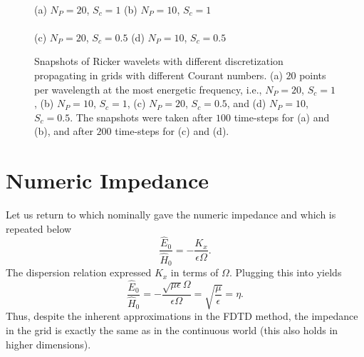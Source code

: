\begin{figure}
  \hspace{.1in}
  \\
  \mbox{}\hspace{1.in}(a) $N_P=20$, $S_c=1$
         \hspace{1.95in}(b) $N_P=10$, $S_c=1$\\

  \vspace{.1in}
  \hspace{.1in}
  \\
  \mbox{}\hspace{.95in}(c) $N_P=20$, $S_c=0.5$
         \hspace{1.95in}(d) $N_P=10$, $S_c=0.5$
  \caption{Snapshots of Ricker wavelets with different discretization
  propagating in grids with different Courant numbers.  (a) $20$
  points per wavelength at the most energetic frequency, i.e.,
  $N_P=20$, $S_c=1$, (b) $N_P=10$, $S_c=1$, (c) $N_P=20$, $S_c=0.5$,
  and (d) $N_P=10$, $S_c=0.5$.  The snapshots were taken after $100$
  time-steps for (a) and (b), and after $200$ time-steps for (c) and
  (d).}  \label{fig:dispDemo}
\end{figure}



\section{Numeric Impedance}

Let us return to  which nominally gave the numeric
impedance and which is repeated below
\begin{equation}
  \frac{\hat{E}_0}{\hat{H}_0} = -\frac{K_x}{\epsilon\Omega}.
  \label{eq:impedance}
\end{equation}
The dispersion relation  expressed $K_x$ in
terms of $\Omega$.  Plugging this into  yields
\begin{equation}
  \frac{\hat{E}_0}{\hat{H}_0} =
     -\frac{\sqrt{\mu\epsilon}\Omega}{\epsilon\Omega} = 
     \sqrt{\frac{\mu}{\epsilon}} =
     \eta.
  \label{eq:impedanceI}
\end{equation}
Thus, despite the inherent approximations in the FDTD method, the
impedance in the grid is exactly the same as in the continuous world
(this also holds in higher dimensions).

